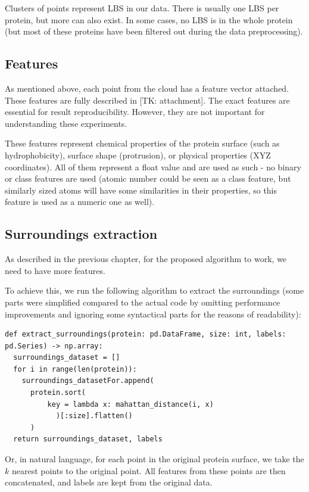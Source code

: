 Clusters of points represent LBS in our data. There is usually one LBS per protein, but more can also exist. In some cases, no LBS is in the whole protein (but most of these proteins have been filtered out during the data preprocessing).

\subsection{Features}

As mentioned above, each point from the cloud has a feature vector attached. These features are fully described in [TK: attachment]. The exact features are essential for result reproducibility. However, they are not important for understanding these experiments. 

These features represent chemical properties of the protein surface (such as hydrophobicity), surface shape (protrusion), or physical properties (XYZ coordinates). All of them represent a float value and are used as such - no binary or class features are used (atomic number could be seen as a class feature, but similarly sized atoms will have some similarities in their properties, so this feature is used as a numeric one as well).

\subsection{Surroundings extraction}
\label{Surroundings}

As described in the previous chapter, for the proposed algorithm to work, we need to have more features.

To achieve this, we run the following algorithm to extract the surroundings (some parts were simplified compared to the actual code by omitting performance improvements and ignoring some syntactical parts for the reasons of readability):

\begin{lstlisting}
def extract_surroundings(protein: pd.DataFrame, size: int, labels: pd.Series) -> np.array:
  surroundings_dataset = []
  for i in range(len(protein)):
    surroundings_datasetFor.append(
      protein.sort(
          key = lambda x: mahattan_distance(i, x)
            )[:size].flatten()
      )
  return surroundings_dataset, labels
\end{lstlisting}

Or, in natural language, for each point in the original protein surface, we take the $k$ nearest points to the original point. All features from these points are then concatenated, and labels are kept from the original data.

